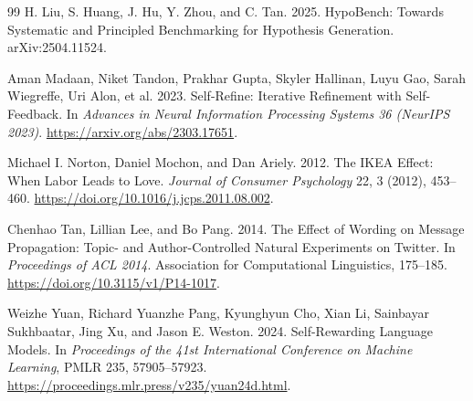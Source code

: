 \documentclass[10pt,twocolumn]{article}
\begin{document}
{\begin{thebibliography}{99}
H. Liu, S. Huang, J. Hu, Y. Zhou, and C. Tan. 2025. HypoBench: Towards Systematic and Principled Benchmarking for Hypothesis Generation. arXiv:2504.11524.

Aman Madaan, Niket Tandon, Prakhar Gupta, Skyler Hallinan, Luyu Gao, Sarah Wiegreffe, Uri Alon, et al. 2023. Self-Refine: Iterative Refinement with Self-Feedback. In \emph{Advances in Neural Information Processing Systems 36 (NeurIPS 2023)}. \url{https://arxiv.org/abs/2303.17651}.

Michael I. Norton, Daniel Mochon, and Dan Ariely. 2012. The IKEA Effect: When Labor Leads to Love. \emph{Journal of Consumer Psychology} 22, 3 (2012), 453--460. \url{https://doi.org/10.1016/j.jcps.2011.08.002}.

Chenhao Tan, Lillian Lee, and Bo Pang. 2014. The Effect of Wording on Message Propagation: Topic- and Author-Controlled Natural Experiments on Twitter. In \emph{Proceedings of ACL 2014}. Association for Computational Linguistics, 175--185. \url{https://doi.org/10.3115/v1/P14-1017}.

Weizhe Yuan, Richard Yuanzhe Pang, Kyunghyun Cho, Xian Li, Sainbayar Sukhbaatar, Jing Xu, and Jason E. Weston. 2024. Self-Rewarding Language Models. In \emph{Proceedings of the 41st International Conference on Machine Learning}, PMLR 235, 57905--57923. \url{https://proceedings.mlr.press/v235/yuan24d.html}.
\end{thebibliography}
}
\end{document}
